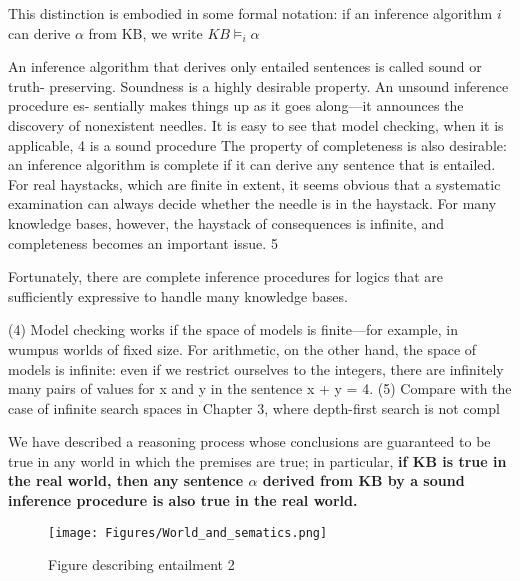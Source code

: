 This distinction is embodied in some formal notation: if
an inference algorithm $i$ can derive $\alpha$ from KB, we write
$KB \models_i \alpha$

An inference algorithm that derives only entailed sentences is called sound or truth-
preserving. Soundness is a highly desirable property. An unsound inference procedure es-
sentially makes things up as it goes along—it announces the discovery of nonexistent needles.
It is easy to see that model checking, when it is applicable, 4 is a sound procedure
The property of completeness is also desirable: an inference algorithm is complete if
it can derive any sentence that is entailed. For real haystacks, which are finite in extent,
it seems obvious that a systematic examination can always decide whether the needle is in
the haystack. For many knowledge bases, however, the haystack of consequences is infinite,
and completeness becomes an important issue. 5

Fortunately, there are complete inference
procedures for logics that are sufficiently expressive to handle many knowledge bases.


(4) Model checking works if the space of models is finite—for example, in wumpus worlds of fixed size. For
arithmetic, on the other hand, the space of models is infinite: even if we restrict ourselves to the integers, there
are infinitely many pairs of values for x and y in the sentence x + y = 4.
(5) Compare with the case of infinite search spaces in Chapter 3, where depth-first search is not compl

We have described a reasoning process whose conclusions are guaranteed to be true
in any world in which the premises are true; in particular, \textbf{if KB is true in the real world,
then any sentence $\alpha$ derived from KB by a sound inference procedure is also true in the real world.}


\begin{figure}[H]
    \centering
    \texttt{[image: Figures/World\_and\_sematics.png]}
    \caption{Figure describing entailment 2}
    \label{fig:entailment}
\end{figure}


















































